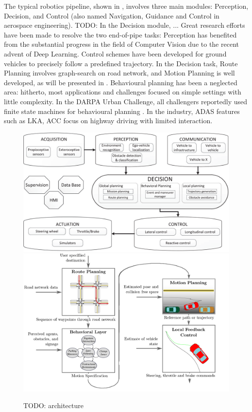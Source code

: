The typical robotics pipeline, shown in , involves three main modules: Perception, Decision, and Control (also named Navigation, Guidance and Control in aerospace engineering).
TODO: In the Decision module, ...
Great research efforts have been made to resolve the two end-of-pipe tasks: Perception has benefited from the substantial progress in the field of Computer Vision due to the recent advent of Deep Learning. Control schemes have been developed for ground vehicles to precisely follow a predefined trajectory.
In the Decision task, Route Planning involves graph-search on road network, and Motion Planning is well developed, as will be presented in . Behavioural planning has been a neglected area: hitherto, most applications and challenges focused on simple settings with little complexity. In the DARPA Urban Challenge, all challengers reportedly used finite state machines for behavioural planning \citep{Buehler2009}. In the industry, ADAS features such as LKA, ACC focus on highway driving with limited interaction. 
\begin{figure}[tp]
	\centering
	\includegraphics[width=0.7\linewidth]{img/architecture-blocks}
	\includegraphics[width=0.7\linewidth]{img/architecture-square}
	\caption{TODO: architecture}
	\label{fig:robotics-pipeline}
\end{figure}

